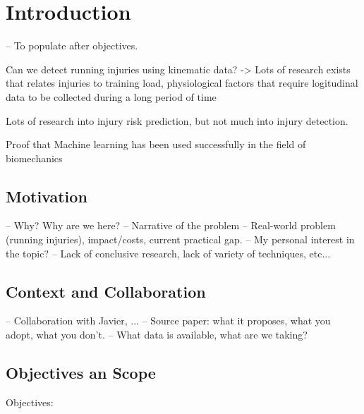 \chapter{Introduction}\label{chap:introduction}
-- To populate after objectives.

Can we detect running injuries using kinematic data? -> Lots of research exists that relates injuries to training load, physiological factors that require logitudinal data to be collected during a long period of time

Lots of research into injury risk prediction, but not much into injury detection.


Proof that Machine learning has been used successfully in the field of biomechanics 


\section{Motivation}\label{sec:intro-motivation}
-- Why? Why are we here?
-- Narrative of the problem
-- Real-world problem (running injuries), impact/costs, current practical gap.
-- My personal interest in the topic?
-- Lack of conclusive research, lack of variety of techniques, etc...

\section{Context and Collaboration}\label{sec:intro-context}
-- Collaboration with Javier, ...
-- Source paper: what it proposes, what you adopt, what you don't.
    -- What data is available, what are we taking?


\section{Objectives an Scope}\label{sec:intro-objectives-scope}
Objectives:\\


